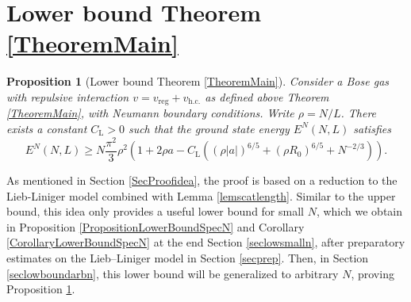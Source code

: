 \documentclass[a4paper,11pt]{article}
\newcommand{\abs}[1]{\left\lvert #1 \right\rvert}
\newtheorem{proposition}[theorem]{Proposition}
\numberwithin{equation}{section}
\begin{document}
\section{Lower bound Theorem \ref{TheoremMain}}	
\label{SecLowerbound}
	\begin{proposition}[Lower bound Theorem \ref{TheoremMain}]
		\label{PropositionLowerBound}
		Consider a Bose gas with repulsive interaction  $v=v_{\text{reg}}+v_{\text{h.c.}}$ as defined above Theorem \ref{TheoremMain}, with Neumann boundary conditions. Write $\rho=N/L$. There exists a constant $C_\text{L}>0$ such that the ground state energy $E^N(N,L)$ satisfies
		\begin{equation}
		\label{eqlower}
		E^N(N,L)\geq N\frac{\pi^2}{3}\rho^2\left(1+2\rho a-C_\text{L}\left((\rho\abs{a})^{6/5}+(\rho R_0)^{6/5}+N^{-2/3}\right)\right).
		\end{equation}
	\end{proposition}
As mentioned in Section \ref{SecProofidea}, the proof is based on a reduction to the Lieb-Liniger model combined with Lemma \ref{lemscatlength}. Similar to the upper bound, this idea only provides a useful lower bound for small $N$, which we obtain in Proposition \ref{PropositionLowerBoundSpecN} and Corollary \ref{CorollaryLowerBoundSpecN} at the end Section \ref{seclowsmalln}, after preparatory estimates on the Lieb--Liniger model in Section \ref{secprep}. Then, in Section \ref{seclowboundarbn}, this lower bound will be generalized to arbitrary $N$, proving Proposition \ref{PropositionLowerBound}.
\end{document}
